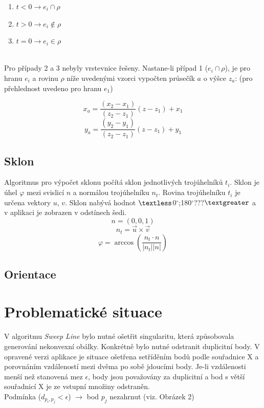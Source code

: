 \documentclass[a4paper, 12pt]{article}
\begin{document}
\begin{enumerate}
\item $t < 0 \rightarrow e_i \cap \rho$
\item $t > 0 \rightarrow e_i \notin \rho$ 
\item $t = 0 \rightarrow e_i \in \rho$
\end{enumerate}
~\\
Pro případy 2 a 3 nebyly vrstevnice řešeny. Nastane-li případ 1 ($e_i \cap \rho$), je pro hranu $e_i$ a rovinu $\rho$ níže uvedenými vzorci vypočten průsečík $a$ o výšce $z_a$: (pro přehlednost uvedeno pro hranu $e_1$)

$$ x_a = \frac{(x_2-x_1)}{(z_2-z_1)}(z-z_1)+x_1 $$
$$ y_a = \frac{(y_2-y_1)}{(z_2-z_1)}(z-z_1)+y_1 $$

\subsection{Sklon}
Algoritmus pro výpočet sklonu počítá sklon jednotlivých trojúhelníků $t_i$. Sklon je úhel $\varphi$ mezi svislicí $n$ a normálou trojúhelníku $n_t$. Rovina trojúhelníku $t_i$ je určena vektory $u$, $v$. Sklon nabývá hodnot $\textless$0$^\circ$;180$^\circ$???$\textgreater$ a v aplikaci je zobrazen v odstínech šedi.\\

$$n = (0,0,1)$$
$$n_t = \vec{u}\times \vec{v}$$
$$\varphi =\arccos(\frac{n_t \cdot n}{|n_t| |n|})$$

\subsection{Orientace}




\section{Problematické situace}
V algoritmu \textit{Sweep Line} bylo nutné ošetřit singularitu, která způsobovala generování nekonvexní obálky. Konkrétně bylo nutné odstranit duplicitní body. V opravené verzi aplikace je situace ošetřena setříděním bodů podle souřadnice X a porovnáním vzdáleností mezi dvěma po sobě jdoucími body. Je-li vzdálenosti menší než stanovená mez $\epsilon$, body jsou považovány za duplicitní a bod s větší souřadnicí X je ze vstupní množiny odstraněn. \\

Podmínka ($d_{p_i,p_j} < \epsilon$) $\rightarrow$ bod $p_j$ nezahrnut (viz. Obrázek 2)\\
\end{document}
